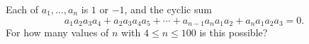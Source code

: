 Each of $a_1,\dots,a_n$ is $1$ or $-1$, and the cyclic sum
\[a_1a_2a_3a_4+a_2a_3a_4a_5+\cdots+a_{n-1}a_na_1a_2+a_na_1a_2a_3=0.\]
For how many values of $n$ with $4\le n\le100$ is this possible?
